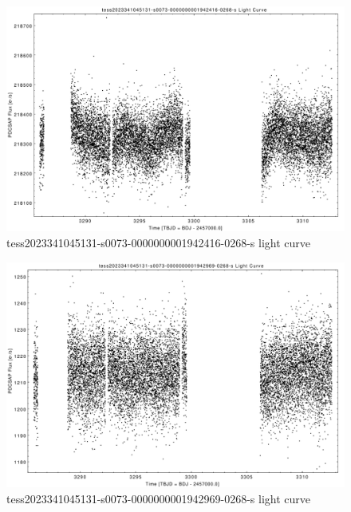 \documentclass[a4paper,12pt]{article}
\begin{document}
\begin{figure}[htbp]
    \centering
    \includegraphics[width = 1\textwidth]{
      ../lightcurves/tess2023341045131-s0073-0000000001942416-0268-s.pdf}
    \caption{tess2023341045131-s0073-0000000001942416-0268-s light curve}
\end{figure}
\begin{figure}[htbp]
    \centering
    \includegraphics[width = 1\textwidth]{
      ../lightcurves/tess2023341045131-s0073-0000000001942969-0268-s.pdf}
    \caption{tess2023341045131-s0073-0000000001942969-0268-s light curve}
\end{figure}
\end{document}
